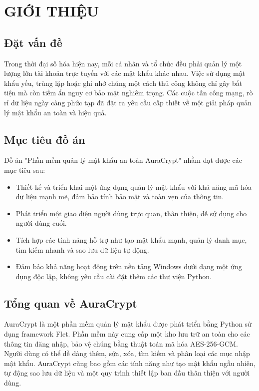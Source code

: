 \chapter{GIỚI THIỆU}
\section{Đặt vấn đề}
Trong thời đại số hóa hiện nay, mỗi cá nhân và tổ chức đều phải quản lý một lượng lớn tài khoản trực tuyến với các mật khẩu khác nhau. Việc sử dụng mật khẩu yếu, trùng lặp hoặc ghi nhớ chúng một cách thủ công không chỉ gây bất tiện mà còn tiềm ẩn nguy cơ bảo mật nghiêm trọng. Các cuộc tấn công mạng, rò rỉ dữ liệu ngày càng phức tạp đã đặt ra yêu cầu cấp thiết về một giải pháp quản lý mật khẩu an toàn và hiệu quả.

\section{Mục tiêu đồ án}
Đồ án "Phần mềm quản lý mật khẩu an toàn AuraCrypt" nhằm đạt được các mục tiêu sau:
\begin{itemize}
    \item Thiết kế và triển khai một ứng dụng quản lý mật khẩu với khả năng mã hóa dữ liệu mạnh mẽ, đảm bảo tính bảo mật và toàn vẹn của thông tin.
    \item Phát triển một giao diện người dùng trực quan, thân thiện, dễ sử dụng cho người dùng cuối.
    \item Tích hợp các tính năng hỗ trợ như tạo mật khẩu mạnh, quản lý danh mục, tìm kiếm nhanh và sao lưu dữ liệu tự động.
    \item Đảm bảo khả năng hoạt động trên nền tảng Windows dưới dạng một ứng dụng độc lập, không yêu cầu cài đặt thêm các thư viện Python.
\end{itemize}

\section{Tổng quan về AuraCrypt}
AuraCrypt là một phần mềm quản lý mật khẩu được phát triển bằng Python sử dụng framework Flet. Phần mềm này cung cấp một kho lưu trữ an toàn cho các thông tin đăng nhập, bảo vệ chúng bằng thuật toán mã hóa AES-256-GCM. Người dùng có thể dễ dàng thêm, sửa, xóa, tìm kiếm và phân loại các mục nhập mật khẩu. AuraCrypt cũng bao gồm các tính năng như tạo mật khẩu ngẫu nhiên, tự động sao lưu dữ liệu và một quy trình thiết lập ban đầu thân thiện với người dùng.

